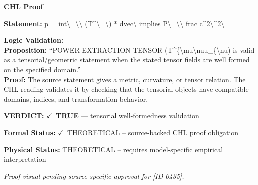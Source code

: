 \vspace{0.45em}
\noindent\textbf{CHL Proof}\par
\textbf{Statement:} p = int\textbackslash{}\_\textbackslash{}\textbackslash{} (T\textasciicircum{}\textbackslash{}\_\textbackslash{}) * dvec\textbackslash{} implies P\textbackslash{}\_\textbackslash{}\textbackslash{} frac c\textasciicircum{}2\textbackslash{}\textasciicircum{}2\textbackslash{}

\textbf{Logic Validation:}\\
\textbf{Proposition:} ``POWER EXTRACTION TENSOR (T\textasciicircum{}\{\textbackslash{}mu\textbackslash{}nuu\_\{\textbackslash{}nu) is valid as a tensorial/geometric statement
when the stated tensor fields are well formed on the specified domain.''\\
\textbf{Proof:} The source statement gives a metric, curvature, or tensor relation. The CHL reading
validates it by checking that the tensorial objects have compatible domains, indices,
and transformation behavior.

\textbf{VERDICT:} \ensuremath{\checkmark}\ \textbf{TRUE} --- tensorial well-formedness validation

\textbf{Formal Status:} \ensuremath{\checkmark}\ THEORETICAL -- source-backed CHL proof obligation

\textbf{Physical Status:} THEORETICAL -- requires model-specific empirical interpretation
\par\vspace{0.45em}
\par
\vfill
\begingroup\footnotesize\itshape
Proof visual pending source-specific approval for [ID 0435].
\par\endgroup
\vfill
\endgroup
\endgroup
